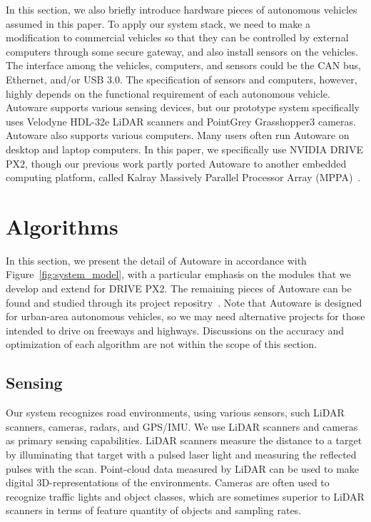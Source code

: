 In this section, we also briefly introduce hardware pieces of autonomous
vehicles assumed in this paper.
To apply our system stack, we need to make a modification to commercial
vehicles so that they can be controlled by external computers through
some secure gateway, and also install sensors on the vehicles.
The interface among the vehicles, computers, and sensors could be the
CAN bus, Ethernet, and/or USB 3.0.
The specification of sensors and computers, however, highly depends on
the functional requirement of each autonomous vehicle.
Autoware supports various sensing devices, but our prototype system
specifically uses Velodyne HDL-32e LiDAR scanners and PointGrey
Grasshopper3 cameras.
Autoware also supports various computers.
Many users often run Autoware on desktop and laptop computers.
In this paper, we specifically use NVIDIA DRIVE PX2, though our previous
work partly ported Autoware to another embedded computing platform,
called Kalray Massively Parallel Processor Array
(MPPA)~\cite{yuya2017exploring}. 

\section{Algorithms}
\label{sec:algorithms}

In this section, we present the detail of Autoware in accordance with
Figure~\ref{fig:system_model}, with a particular emphasis on the modules
that we develop and extend for DRIVE PX2.
The remaining pieces of Autoware can be found and studied through its
project repositry~\cite{autoware}.
Note that Autoware is designed for urban-area autonomous vehicles, so we
may need alternative projects for those intended to drive on freeways
and highways.
Discussions on the accuracy and optimization of each algorithm are not
within the scope of this section.

\subsection{Sensing}
\label{sec:sensing}
Our system recognizes road environments, using various sensors, such
LiDAR scanners, cameras, radars, and GPS/IMU.
We use LiDAR scanners and cameras as primary sensing capabilities.
LiDAR scanners measure the distance to a target by illuminating that
target with a pulsed laser light and measuring the reflected pulses with
the scan.
Point-cloud data measured by LiDAR can be used to make digital
3D-representations of the environments.
Cameras are often used to recognize traffic lights and object classes,
which are sometimes superior to LiDAR scanners in terms of feature
quantity of objects and sampling rates.

